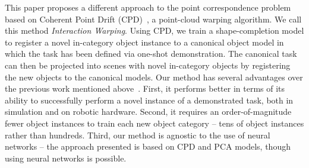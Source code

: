 \documentclass{article}
\begin{document}


This paper proposes a different approach to the point correspondence problem based on Coherent Point Drift (CPD)~\cite{myronenko10pointset},
a point-cloud warping algorithm.
We call this method \emph{Interaction Warping}. Using CPD, we train a shape-completion model to register a novel in-category object instance to a canonical object model in which the task has been defined via one-shot demonstration. The canonical task can then be projected into scenes with novel in-category objects by registering the new objects to the canonical models. Our method has several advantages over the previous work mentioned above~\cite{pan22taxpose,wang19dynamic,manuelli19kpam}. First, it performs better in terms of its ability to successfully perform a novel instance of a demonstrated task, both in simulation and on robotic hardware. Second, it requires an order-of-magnitude fewer object instances to train each new object category -- tens of object instances rather than hundreds.
Third, our method is agnostic to the use of neural networks -- the approach presented is based on CPD and PCA models, though using neural networks is possible.%

\end{document}
